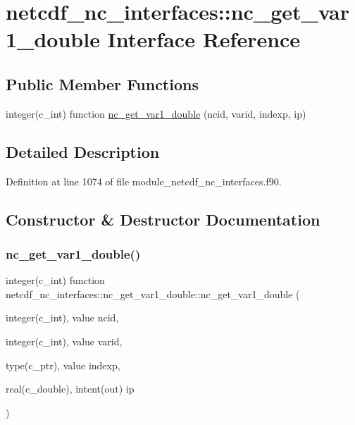 \hypertarget{interfacenetcdf__nc__interfaces_1_1nc__get__var1__double}{}\section{netcdf\+\_\+nc\+\_\+interfaces\+:\+:nc\+\_\+get\+\_\+var1\+\_\+double Interface Reference}
\label{interfacenetcdf__nc__interfaces_1_1nc__get__var1__double}
\subsection*{Public Member Functions}
\begin{DoxyCompactItemize}
\item 
integer(c\+\_\+int) function \hyperlink{interfacenetcdf__nc__interfaces_1_1nc__get__var1__double_aaf9bf9f4dca86f4fadcfc801e5ac09e7}{nc\+\_\+get\+\_\+var1\+\_\+double} (ncid, varid, indexp, ip)
\end{DoxyCompactItemize}


\subsection{Detailed Description}


Definition at line 1074 of file module\+\_\+netcdf\+\_\+nc\+\_\+interfaces.\+f90.



\subsection{Constructor \& Destructor Documentation}
\mbox{\label{interfacenetcdf__nc__interfaces_1_1nc__get__var1__double_aaf9bf9f4dca86f4fadcfc801e5ac09e7}} 
\subsubsection{\texorpdfstring{nc\+\_\+get\+\_\+var1\+\_\+double()}{nc\_get\_var1\_double()}}
{\footnotesize\ttfamily integer(c\+\_\+int) function netcdf\+\_\+nc\+\_\+interfaces\+::nc\+\_\+get\+\_\+var1\+\_\+double\+::nc\+\_\+get\+\_\+var1\+\_\+double (\begin{DoxyParamCaption}\item[{integer(c\+\_\+int), value}]{ncid,  }\item[{integer(c\+\_\+int), value}]{varid,  }\item[{type(c\+\_\+ptr), value}]{indexp,  }\item[{real(c\+\_\+double), intent(out)}]{ip }\end{DoxyParamCaption})}




